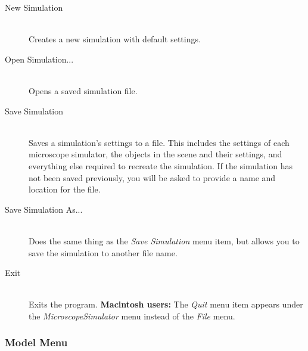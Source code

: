 \documentclass[11pt,titlepage,twoside]{article}
\begin{document}
\begin{description}
  \item[New Simulation] \hfill \\
  Creates a new simulation with default settings.

  \item[Open Simulation...] \hfill \\
  Opens a saved simulation file.

  \item[Save Simulation] \hfill \\
   Saves a simulation's settings to a file. This includes the settings of each microscope simulator, the objects in the scene and their settings, and everything else required to recreate the simulation. If the simulation has not been saved previously, you will be asked to provide a name and location for the file.
   
  \item[Save Simulation As...] \hfill \\
  Does the same thing as the \emph{Save Simulation} menu item, but allows you to save the simulation to another file name.
  
  \item[Exit] \hfill \\
  Exits the program. \textbf{Macintosh users:} The \emph{Quit} menu item appears under the \emph{MicroscopeSimulator} menu instead of the \emph{File} menu.

\end{description}

%
%
%
%
%  
%

\subsubsection{Model Menu}
\label{sec:ModelMenu}
\end{document}
